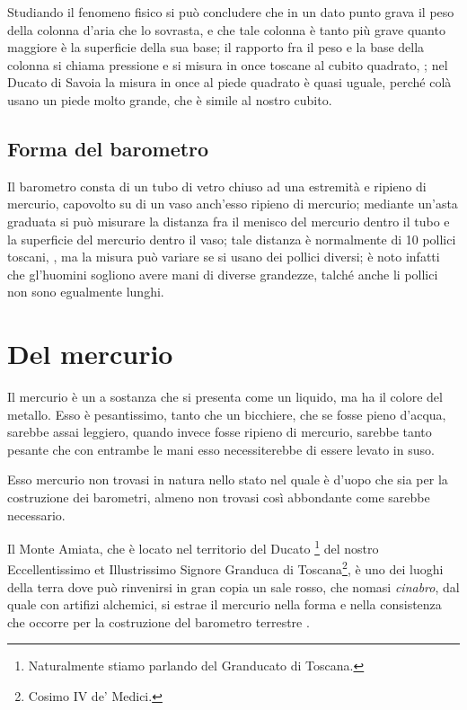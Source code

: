 \documentclass[
    corpo=11.5pt,
    oneside,
    evenboxes,
    tipotesi=triennale,
    stile=classica,
    oldstyle,
    autoretitolo,
    greek,
]{toptesi}
\begin{document}
\begin{interlinea}{2} Studiando il fenomeno fisico si pu\`o concludere
che in un dato punto grava il peso della colonna d'aria che lo
sovrasta, e che tale colonna \`e tanto pi\`u grave quanto maggiore
\`e la superficie della sua base; il rapporto fra il peso e la base
della colonna si chiama pressione e si misura in once toscane al cubito
quadrato, \cite{tor1}; nel Ducato di Savoia la misura in once al piede
quadrato \`e quasi uguale, perch\'e col\`a usano un piede molto
grande, che \`e simile al nostro cubito.
\end{interlinea}

\subsection{Forma del barometro}
Il barometro consta di un tubo di vetro chiuso ad una estremit\`a e
ripieno di mercurio, capovolto su di un vaso anch'esso ripieno di
mercurio; mediante un'asta graduata si pu\`o misurare la distanza fra
il menisco del mercurio dentro il tubo e la superficie del mercurio
dentro il vaso; tale distanza \`e normalmente di 10 pollici toscani,
\cite{tor1,tor2}, ma la misura pu\`o variare se si usano dei pollici
diversi; \`e noto infatti che gl'huomini sogliono avere mani di
diverse grandezze, talch\'e anche li pollici non sono egualmente
lunghi.
\section{Del mercurio}
Il mercurio \`e un a sostanza che si presenta come un liquido, ma ha il colore
del metallo. Esso \`e pesantissimo, tanto che un bicchiere, che se fosse pieno
d'acqua, sarebbe assai leggiero, quando invece fosse ripieno di mercurio,
sarebbe tanto pesante che con entrambe le mani esso necessiterebbe di essere
levato in suso.

Esso mercurio non trovasi in natura nello stato nel quale \`e d'uopo che sia
per la costruzione dei barometri, almeno non trovasi cos\`i abbondante come
sarebbe necessario.

\setcounter{footnote}{25}

Il Monte Amiata, che \`e locato nel territorio del Ducato%
\footnote{Naturalmente stiamo parlando del Granducato di Toscana.%
\ifclassica\NoteWhiteLine\fi
} del nostro Eccellentissimo et Illustrissimo Signore Granduca di Toscana\footnote{Cosimo IV de' Medici.}, \`e uno dei
luoghi della terra dove pu\`o rinvenirsi in gran copia un sale rosso, che
nomasi \emph{cinabro}, dal quale con artifizi alchemici, si estrae il mercurio
nella forma e nella consistenza che occorre per la costruzione del barometro
terrestre%
\ifclassica
{}\fi.
\end{document}
